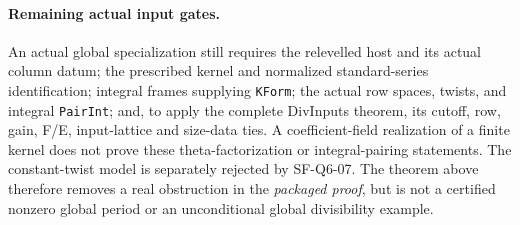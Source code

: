\documentclass[11pt,a4paper]{article}
\theoremstyle{definition}
\theoremstyle{remark}
\begin{document}
\paragraph{Remaining actual input gates.}
An actual global specialization still requires the relevelled host
and its actual column datum; the prescribed kernel and normalized
standard-series identification; integral frames supplying
\texttt{KForm}; the actual row spaces, twists, and integral
\texttt{PairInt}; and, to apply the complete DivInputs theorem,
its cutoff, row, gain, F/E, input-lattice and size-data ties.
A coefficient-field realization of a finite kernel does not prove
these theta-factorization or integral-pairing statements.
The constant-twist model is separately rejected by SF-Q6-07.
The theorem above therefore removes a real obstruction in the
\emph{packaged proof}, but is not a certified nonzero global period
or an unconditional global divisibility example.
\end{document}
